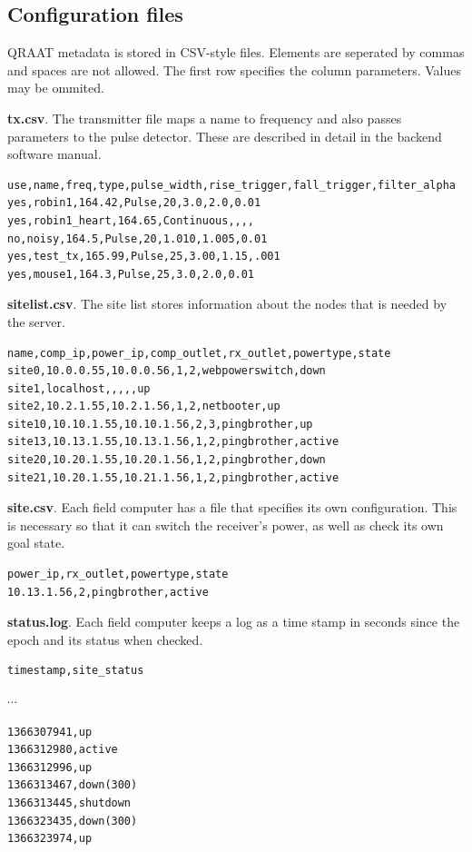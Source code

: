 \documentclass[letter]{article}
\begin{document}
\pagebreak
\begin{appendices}

\section{Configuration files}
QRAAT metadata is stored in CSV-style files. Elements are seperated by commas and 
spaces are not allowed. The first row specifies the column parameters. Values may
be ommited. 

\textbf{tx.csv}. The transmitter file maps a name to frequency and also passes 
parameters to the pulse detector. These are described in detail in the backend
software manual. 
\begin{verbatim}
use,name,freq,type,pulse_width,rise_trigger,fall_trigger,filter_alpha
yes,robin1,164.42,Pulse,20,3.0,2.0,0.01
yes,robin1_heart,164.65,Continuous,,,,
no,noisy,164.5,Pulse,20,1.010,1.005,0.01
yes,test_tx,165.99,Pulse,25,3.00,1.15,.001
yes,mouse1,164.3,Pulse,25,3.0,2.0,0.01
\end{verbatim}

\textbf{sitelist.csv}. The site list stores information about the nodes that is needed
by the server. 
\begin{verbatim}
name,comp_ip,power_ip,comp_outlet,rx_outlet,powertype,state
site0,10.0.0.55,10.0.0.56,1,2,webpowerswitch,down
site1,localhost,,,,,up
site2,10.2.1.55,10.2.1.56,1,2,netbooter,up
site10,10.10.1.55,10.10.1.56,2,3,pingbrother,up
site13,10.13.1.55,10.13.1.56,1,2,pingbrother,active
site20,10.20.1.55,10.20.1.56,1,2,pingbrother,down
site21,10.20.1.55,10.21.1.56,1,2,pingbrother,active
\end{verbatim}

\textbf{site.csv}. Each field computer has a file that specifies its own configuration. 
This is necessary so that it can switch the receiver's power, as well as check its own 
goal state. 
\begin{verbatim}
power_ip,rx_outlet,powertype,state
10.13.1.56,2,pingbrother,active
\end{verbatim}

\textbf{status.log}. Each field computer keeps a log as a time stamp
in seconds since the epoch and its status when checked. 
\begin{verbatim}
timestamp,site_status
\end{verbatim}
\quad \quad $\cdots$
\begin{verbatim}
1366307941,up
1366312980,active
1366312996,up
1366313467,down(300)
1366313445,shutdown
1366323435,down(300)
1366323974,up
\end{verbatim}


\end{appendices}
\end{document}
